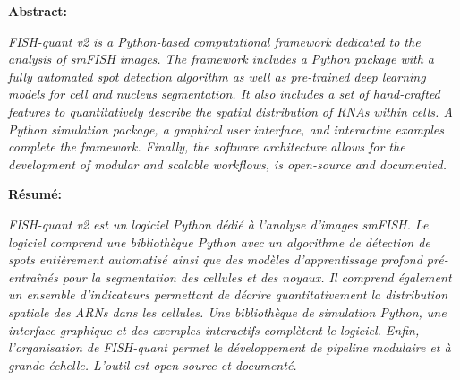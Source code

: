 
\textbf{Abstract:}
\hspace{0.5cm}

\textit{
FISH-quant v2 is a Python-based computational framework dedicated to the analysis of smFISH images.
The framework includes a Python package with a fully automated spot detection algorithm as well as pre-trained deep learning models for cell and nucleus segmentation.
It also includes a set of hand-crafted features to quantitatively describe the spatial distribution of RNAs within cells.
A Python simulation package, a graphical user interface, and interactive examples complete the framework.
Finally, the software architecture allows for the development of modular and scalable workflows, is open-source and documented.
}

\vspace{0.5cm}

\noindent
\textbf{Résumé:}
\hspace{0.5cm}

\textit{
FISH-quant v2 est un logiciel Python dédié à l'analyse d'images smFISH.
Le logiciel comprend une bibliothèque Python avec un algorithme de détection de spots entièrement automatisé ainsi que des modèles d'apprentissage profond pré-entraînés pour la segmentation des cellules et des noyaux.
Il comprend également un ensemble d'indicateurs permettant de décrire quantitativement la distribution spatiale des ARNs dans les cellules.
Une bibliothèque de simulation Python, une interface graphique et des exemples interactifs complètent le logiciel.
Enfin, l'organisation de FISH-quant permet le développement de pipeline modulaire et à grande échelle.
L'outil est open-source et documenté.
}